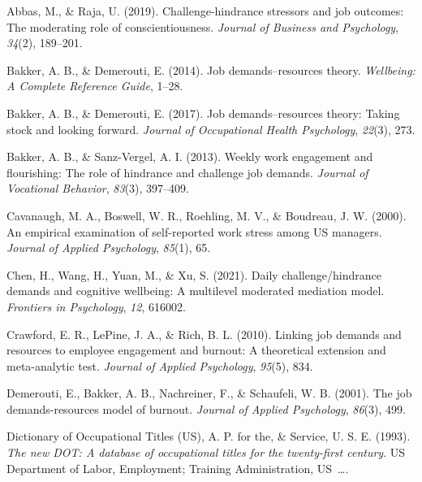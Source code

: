 \documentclass[
  man]{apa6}
\newlength{\cslhangindent}
\newlength{\cslentryspacingunit} %
\newenvironment{CSLReferences}[2] %
 {%
  \setlength{\parindent}{0pt}
  \ifodd #1
  \let\oldpar\par
  \def\par{\hangindent=\cslhangindent\oldpar}
  \fi
  \setlength{\parskip}{#2\cslentryspacingunit}
 }%
 {}
\begin{document}
\hypertarget{refs}{}
\begin{CSLReferences}{1}{0}
\leavevmode{}%
Abbas, M., \& Raja, U. (2019). Challenge-hindrance stressors and job outcomes: The moderating role of conscientiousness. \emph{Journal of Business and Psychology}, \emph{34}(2), 189--201.

\leavevmode{}%
Bakker, A. B., \& Demerouti, E. (2014). Job demands--resources theory. \emph{Wellbeing: A Complete Reference Guide}, 1--28.

\leavevmode{}%
Bakker, A. B., \& Demerouti, E. (2017). Job demands--resources theory: Taking stock and looking forward. \emph{Journal of Occupational Health Psychology}, \emph{22}(3), 273.

\leavevmode{}%
Bakker, A. B., \& Sanz-Vergel, A. I. (2013). Weekly work engagement and flourishing: The role of hindrance and challenge job demands. \emph{Journal of Vocational Behavior}, \emph{83}(3), 397--409.

\leavevmode{}%
Cavanaugh, M. A., Boswell, W. R., Roehling, M. V., \& Boudreau, J. W. (2000). An empirical examination of self-reported work stress among US managers. \emph{Journal of Applied Psychology}, \emph{85}(1), 65.

\leavevmode{}%
Chen, H., Wang, H., Yuan, M., \& Xu, S. (2021). Daily challenge/hindrance demands and cognitive wellbeing: A multilevel moderated mediation model. \emph{Frontiers in Psychology}, \emph{12}, 616002.

\leavevmode{}%
Crawford, E. R., LePine, J. A., \& Rich, B. L. (2010). Linking job demands and resources to employee engagement and burnout: A theoretical extension and meta-analytic test. \emph{Journal of Applied Psychology}, \emph{95}(5), 834.

\leavevmode{}%
Demerouti, E., Bakker, A. B., Nachreiner, F., \& Schaufeli, W. B. (2001). The job demands-resources model of burnout. \emph{Journal of Applied Psychology}, \emph{86}(3), 499.

\leavevmode{}%
Dictionary of Occupational Titles (US), A. P. for the, \& Service, U. S. E. (1993). \emph{The new DOT: A database of occupational titles for the twenty-first century}. US Department of Labor, Employment; Training Administration, US~\ldots.


\end{CSLReferences}
\end{document}
